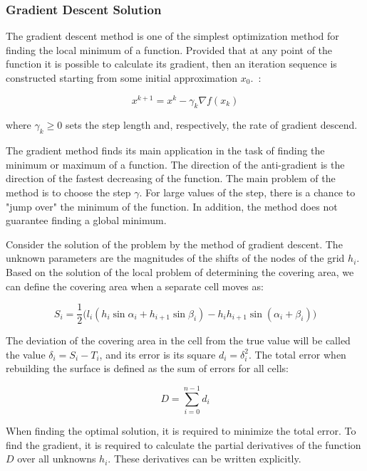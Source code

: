 \subsubsection{Gradient Descent Solution}

The gradient descent method is one of the simplest optimization method for finding the local minimum of a function.
Provided that at any point of the function it is possible to calculate its gradient, then an iteration sequence is constructed starting from some initial approximation $x_0$.~\cite{Kantorovich}:

\begin{equation}
x^{k+1} = x^k - \gamma _k \nabla f(x_k)
\end{equation}

where $\gamma _k \geq 0$ sets the step length and, respectively, the rate of gradient descend.

The gradient method finds its main application in the task of finding the minimum or maximum of a function.
The direction of the anti-gradient is the direction of the fastest decreasing of the function.
The main problem of the method is to choose the step $\gamma$.
For large values of the step, there is a chance to "jump over" the minimum of the function.
In addition, the method does not guarantee finding a global minimum.

Consider the solution of the problem by the method of gradient descent.
The unknown parameters are the magnitudes of the shifts of the nodes of the grid $h_i$.
Based on the solution of the local problem of determining the covering area, we can define the covering area when a separate cell moves as:

\begin{equation}
S_i = \frac{1}{2}\big(l_i(h_i \sin \alpha_i + h_{i + 1} \sin \beta_i) - h_ih_{i + 1} \sin(\alpha_i + \beta_i)\big) 
\end{equation}

The deviation of the covering area in the cell from the true value will be called the value $\delta_i = S_i - T_i$, and its error is its square $d_i = \delta_i^2$.
The total error when rebuilding the surface is defined as the sum of errors for all cells:

\begin{equation}
D = \sum_{i = 0}^{n - 1}{d_i}
\end{equation}

When finding the optimal solution, it is required to minimize the total error.
To find the gradient, it is required to calculate the partial derivatives of the function $D$ over all unknowns $h_i$.
These derivatives can be written explicitly.

